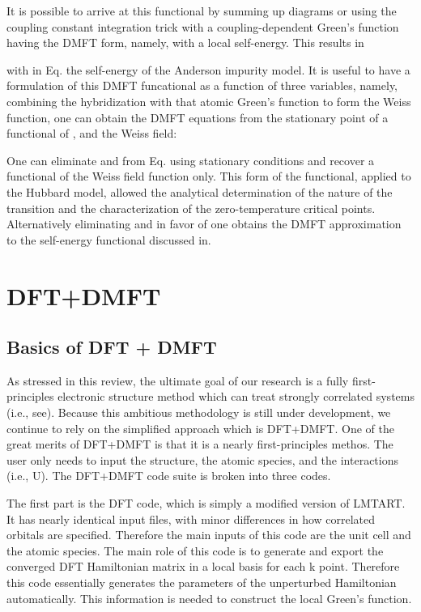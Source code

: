 \documentclass[12 pt]{article}
\begin{document}
{  It is possible to arrive at this functional by summing up diagrams or using the coupling constant integration 
trick with a coupling-dependent Green's function having the DMFT form, namely, with a local self-energy. This 
results in

  with in Eq. the self-energy of the Anderson impurity model. It is useful to have a formulation of this DMFT 
funcational as a function of three variables, namely, combining the hybridization with that atomic Green's 
function to form the Weiss function, one can obtain the DMFT equations from the stationary point of a functional 
of , and the Weiss field:

  One can eliminate and from Eq. using stationary conditions and recover a functional of the Weiss field function 
only. This form of the functional, applied to the Hubbard model, allowed the analytical determination of the nature 
of the transition and the characterization of the zero-temperature critical points. Alternatively eliminating and 
in favor of one obtains the DMFT approximation to the self-energy functional discussed in. 

      \newpage
    \section{\textbf{DFT+DMFT}}\label{sec:DFT+DMFT}
      \subsection{Basics of DFT + DMFT}\label{subsec:Basics of DFT+DMFT}

  As stressed in this review, the ultimate goal of our research is a fully first-principles electronic structure 
method which can treat strongly correlated systems (i.e., see). Because this ambitious methodology is still 
under development, we continue to rely on the simplified approach which is DFT+DMFT. One of the great merits of 
DFT+DMFT is that it is a nearly first-principles methos. The user only needs to input the structure, the atomic 
species, and the interactions (i.e., U). The DFT+DMFT code suite is broken into three codes. 

  The first part is the DFT code, which is simply a modified version of LMTART. It has nearly identical input 
files, with minor differences in how correlated orbitals are specified. Therefore the main inputs of this code 
are the unit cell and the atomic species. The main role of this code is to generate and export the converged DFT 
Hamiltonian matrix in a local basis for each k point. Therefore this code essentially generates the parameters of 
the unperturbed Hamiltonian automatically. This information is needed to construct the local Green's function. 

}
\end{document}
